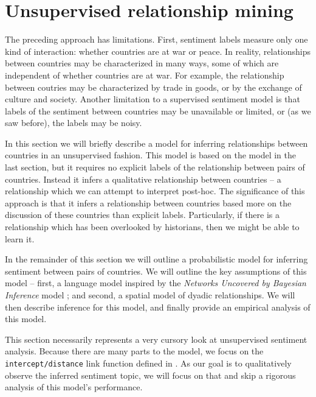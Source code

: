 \section*{Unsupervised relationship mining}


The preceding approach has limitations.  First, sentiment
labels measure only one kind of interaction: whether countries are at
war or peace.  In reality, relationships between countries may be
characterized in many ways, some of which are independent of whether
countries are at war.  For example, the relationship between coutries
may be characterized by trade in goods, or by the exchange of culture
and society. Another limitation to a supervised sentiment model is
that labels of the sentiment between countries may be unavailable or
limited, or (as we saw before), the labels may be noisy.

In this section we will briefly describe a model for inferring
relationships between countries in an unsupervised fashion.  This
model is based on the model in the last section, but it requires no
explicit labels of the relationship between pairs of countries.
Instead it infers a qualitative relationship between countries -- a
relationship which we can attempt to interpret post-hoc.  The
significance of this approach is that it infers a relationship between
countries based more on the discussion of these countries than
explicit labels.  Particularly, if there is a relationship which has
been overlooked by historians, then we might be able to learn it.

In the remainder of this section we will outline a probabilistic model
for inferring sentiment between pairs of countries.  We will outline
the key assumptions of this model -- first, a language model inspired
by the \emph{Networks Uncovered by Bayesian Inference} model
\citep{chang:2009nubbi}; and second, a spatial model of dyadic
relationships. We will then describe inference for this model, and
finally provide an empirical analysis of this model.

This section necessarily represents a very cursory look at
unsupervised sentiment analysis.  Because there are many parts to the
model, we focus on the \verb!intercept/distance! link function defined
in .  As our goal is to qualitatively observe
the inferred sentiment topic, we will focus on that and skip a
rigorous analysis of this model's performance.

